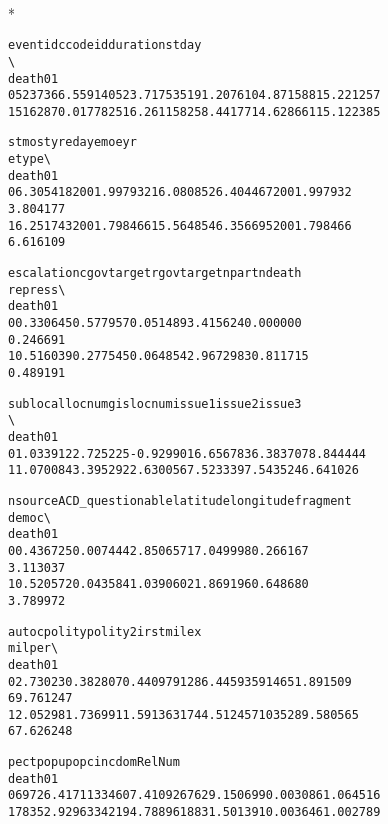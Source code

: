 \documentclass[letterpaper,10pt,english]{/usr/share/sphinx/texinputs/sphinxhowto}
\def\smaller{\fontsize{9.5pt}{9.5pt}\selectfont}
\newenvironment{InvisibleVerbatim}
        {\begin{mdframed}[leftmargin=0.1\linewidth,innerleftmargin=3pt,innerrightmargin=3pt, userdefinedwidth=1\linewidth, linewidth=0pt, linecolor=white, usetwoside=false]}
        {\end{mdframed}}
\begin{document}
                \makebox[0.1\linewidth]{\smaller\hfill\tt\color{nbframe-out-prompt}Out\hspace{4pt}{[}11{]}:\hspace{4pt}}\\*
                \vspace{-2.55\baselineskip}\begin{InvisibleVerbatim}
                \vspace{-0.5\baselineskip}
\begin{alltt}                eventid       ccode          id  duration      stday
\textbackslash{}
death01
0        5237366.559140  523.717535  191.207610  4.871588  15.221257
1        5162870.017782  516.261158  258.441771  4.628661  15.122385

             stmo         styr       eday       emo          eyr
etype  \textbackslash{}
death01
0        6.305418  2001.997932  16.080852  6.404467  2001.997932
3.804177
1        6.251743  2001.798466  15.564854  6.356695  2001.798466
6.616109

         escalation  cgovtarget  rgovtarget     npart     ndeath
repress  \textbackslash{}
death01
0          0.330645    0.577957    0.051489  3.415624   0.000000
0.246691
1          0.516039    0.277545    0.064854  2.967298  30.811715
0.489191

         sublocal    locnum  gislocnum    issue1    issue2    issue3
\textbackslash{}
death01
0        1.033912  2.725225  -0.929901  6.656783  6.383707  8.844444
1        1.070084  3.395292   2.630056  7.523339  7.543524  6.641026

          nsource  ACD\_questionable  latitude  longitude  fragment
democ  \textbackslash{}
death01
0        0.436725          0.007444  2.850657  17.049998  0.266167
3.113037
1        0.520572          0.043584  1.039060  21.869196  0.648680
3.789972

           autoc    polity   polity2         irst           milex
milper  \textbackslash{}
death01
0        2.73023  0.382807  0.440979  1286.445935   914651.891509
69.761247
1        2.05298  1.736991  1.591363  1744.512457  1035289.580565
67.626248

                  pec          tpop         upop      cinc  domRelNum
death01
0        69726.417113  34607.410926  7629.150699  0.003086   1.064516
1        78352.929633  42194.788961  8831.501391  0.003646   1.002789\end{alltt}

            \end{InvisibleVerbatim}
            
\end{document}
